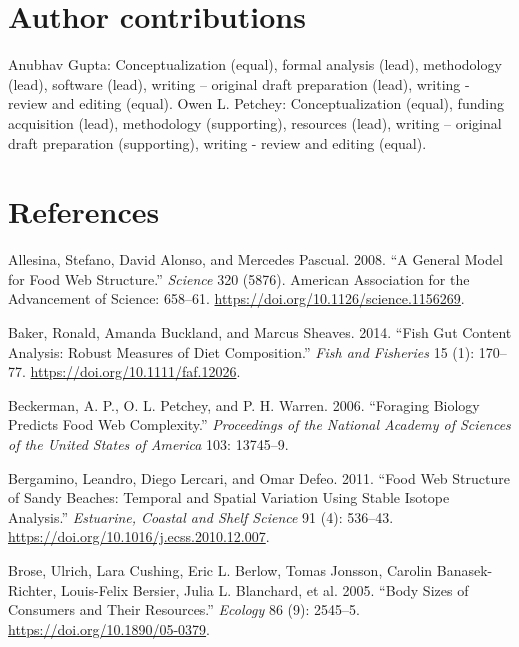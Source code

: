 \documentclass{article}
\begin{document}
\hypertarget{author-contributions}{%
\section{Author contributions}\label{author-contributions}}

Anubhav Gupta: Conceptualization (equal), formal analysis (lead),
methodology (lead), software (lead), writing -- original draft
preparation (lead), writing - review and editing (equal). Owen L.
Petchey: Conceptualization (equal), funding acquisition (lead),
methodology (supporting), resources (lead), writing -- original draft
preparation (supporting), writing - review and editing (equal).

\hypertarget{references}{%
\section*{References}\label{references}}

\hypertarget{refs}{}
\leavevmode\hypertarget{ref-allesinaGeneralModelFood2008}{}%
Allesina, Stefano, David Alonso, and Mercedes Pascual. 2008. ``A General
Model for Food Web Structure.'' \emph{Science} 320 (5876). American
Association for the Advancement of Science: 658--61.
\url{https://doi.org/10.1126/science.1156269}.

\leavevmode\hypertarget{ref-bakerFishGutContent2014}{}%
Baker, Ronald, Amanda Buckland, and Marcus Sheaves. 2014. ``Fish Gut
Content Analysis: Robust Measures of Diet Composition.'' \emph{Fish and
Fisheries} 15 (1): 170--77. \url{https://doi.org/10.1111/faf.12026}.

\leavevmode\hypertarget{ref-beckermanForagingBiologyPredicts2006}{}%
Beckerman, A. P., O. L. Petchey, and P. H. Warren. 2006. ``Foraging
Biology Predicts Food Web Complexity.'' \emph{Proceedings of the
National Academy of Sciences of the United States of America} 103:
13745--9.

\leavevmode\hypertarget{ref-bergaminoFoodWebStructure2011}{}%
Bergamino, Leandro, Diego Lercari, and Omar Defeo. 2011. ``Food Web
Structure of Sandy Beaches: Temporal and Spatial Variation Using Stable
Isotope Analysis.'' \emph{Estuarine, Coastal and Shelf Science} 91 (4):
536--43. \url{https://doi.org/10.1016/j.ecss.2010.12.007}.

\leavevmode\hypertarget{ref-broseBodySizesConsumers2005}{}%
Brose, Ulrich, Lara Cushing, Eric L. Berlow, Tomas Jonsson, Carolin
Banasek-Richter, Louis-Felix Bersier, Julia L. Blanchard, et al. 2005.
``Body Sizes of Consumers and Their Resources.'' \emph{Ecology} 86 (9):
2545--5. \url{https://doi.org/10.1890/05-0379}.
\end{document}
